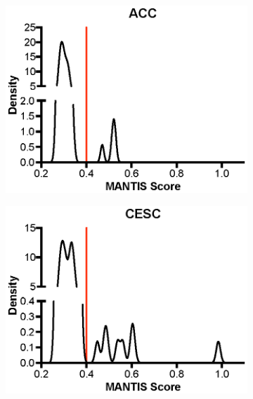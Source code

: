 \begin{figure}[ht]
    \centering
	\begin{subfigure}{0.33\textwidth}
		\includegraphics[width=\linewidth,keepaspectratio]{images/msilandscape/landscape_kd_acc}
		\caption{}\label{fig:msilandscape:landscape_kd_acc}
	\end{subfigure}%
	\hfill%
	\begin{subfigure}{0.33\textwidth}
		\includegraphics[width=\linewidth,keepaspectratio]{images/msilandscape/landscape_kd_cesc}
		\caption{}\label{fig:msilandscape:landscape_kd_cesc}
	\end{subfigure}%
	\hfill%
	\begin{subfigure}{0.33\textwidth}

\end{subfigure}
\end{figure}
